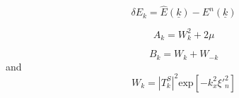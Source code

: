 \begin{equation} \label{eq:hh.inversion.deltaE}
    \delta E_k = \hat{E}(\underline{k}) - E^n(\underline{k})
\end{equation}

\begin{equation} \label{eq:hh.inversion.A_k}
    A_k = W^2_k + 2\mu
\end{equation}

\begin{equation} \label{eq:hh.inversion.B_k}
    B_k = W_k + W_{-k}
\end{equation}
and
\begin{equation} \label{eq:hh.inversion.W_k}
    W_k =  \left | T^S_{k} \right |^2 \text{exp} \left [ -k^2_x {\xi}'^2_n \right ] 
\end{equation}

